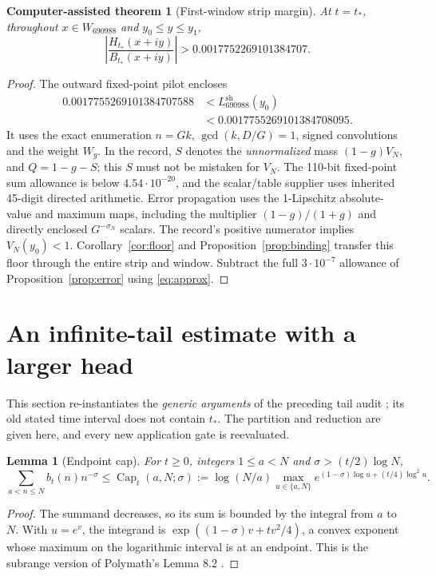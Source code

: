 \documentclass[11pt]{article}
\newtheorem{certtheorem}[theorem]{Computer-assisted theorem}
\newtheorem{lemma}[theorem]{Lemma}
\theoremstyle{remark}
\newcommand{\tstar}{t_*}
\DeclareMathOperator{\Capbd}{Cap}
\numberwithin{equation}{section}
\begin{document}
\begin{certtheorem}[First-window strip margin]\label{thm:pilot}
At $t=\tstar$, throughout $x\in W_{690988}$ and $y_0\le y\le y_1$,
\begin{equation}\label{eq:pilotmargin}
 \left|\frac{H_{\tstar}(x+iy)}{B_{\tstar}(x+iy)}\right|
 >0.0017752269101384707.
\end{equation}
\end{certtheorem}
\begin{proof}
The outward fixed-point pilot encloses
\begin{align*}
 0.0017755269101384707588
 &< L_{690988}^{\mathrm{sh}}(y_0)\\
 &<0.0017755269101384708095.
\end{align*}
It uses the exact enumeration $n=Gk$, $\gcd(k,D/G)=1$, signed
convolutions and the weight $W_g$. In the record, $S$ denotes the
\emph{unnormalized} mass $(1-g)V_N$, and $Q=1-g-S$; this $S$ must not
be mistaken for $V_N$. The 110-bit fixed-point sum allowance is below
$4.54\cdot10^{-20}$, and the scalar/table supplier uses inherited
45-digit directed arithmetic. Error propagation uses the 1-Lipschitz
absolute-value and maximum maps, including the multiplier
$(1-g)/(1+g)$ and directly enclosed $G^{-\sigma_N}$ scalars.
The record's positive numerator implies $V_N(y_0)<1$.
Corollary~\ref{cor:floor} and Proposition~\ref{prop:binding} transfer this
floor through the entire strip and window. Subtract the full
$3\cdot10^{-7}$ allowance of Proposition~\ref{prop:error} using
\eqref{eq:approx}.
\end{proof}

\section{An infinite-tail estimate with a larger head}\label{sec:tail}

This section re-instantiates the \emph{generic arguments} of the preceding
tail audit \cite[Sections 3.1--3.8]{audit4}; its old stated time interval
does not contain $\tstar$. The partition and reduction are given here,
and every new application gate is reevaluated.

\begin{lemma}[Endpoint cap]\label{lem:cap}
For $t\ge0$, integers $1\le a<N$ and $\sigma>(t/2)\log N$,
\[
 \sum_{a<n\le N}b_t(n)n^{-\sigma}
 \le\Capbd_t(a,N;\sigma)
 :=\log(N/a)\max_{u\in\{a,N\}}e^{(1-\sigma)\log u+(t/4)\log^2u}.
\]
\end{lemma}
\begin{proof}
The summand decreases, so its sum is bounded by the integral from $a$
to $N$. With $u=e^v$, the integrand is
$\exp((1-\sigma)v+tv^2/4)$, a convex exponent whose maximum on the
logarithmic interval is at an endpoint. This is the subrange version of
Polymath's Lemma 8.2 \cite{polymath}.
\end{proof}
\end{document}
